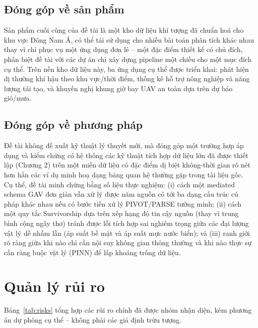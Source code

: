 \documentclass[12pt,a4paper]{report}
\begin{document}
\section{Đóng góp về sản phẩm}

Sản phẩm cuối cùng của đề tài là một kho dữ liệu khí tượng đã chuẩn hoá cho khu vực Đông Nam Á, có thể tái sử dụng cho nhiều bài toán phân tích khác nhau thay vì chỉ phục vụ một ứng dụng đơn lẻ -- một đặc điểm thiết kế có chủ đích, phân biệt đề tài với các dự án chỉ xây dựng pipeline một chiều cho một mục đích cụ thể. Trên nền kho dữ liệu này, ba ứng dụng cụ thể được triển khai: phát hiện dị thường khí hậu theo khu vực/thời điểm, thống kê hỗ trợ nông nghiệp và năng lượng tái tạo, và khuyến nghị khung giờ bay UAV an toàn dựa trên dự báo gió/mưa.

\section{Đóng góp về phương pháp}

Đề tài không đề xuất kỹ thuật lý thuyết mới, mà đóng góp một trường hợp áp dụng và kiểm chứng có hệ thống các kỹ thuật tích hợp dữ liệu lớn đã được thiết lập (Chương 2) trên một miền dữ liệu có đặc điểm dị biệt không-thời gian rõ nét hơn hẳn các ví dụ minh hoạ dạng bảng quan hệ thường gặp trong tài liệu gốc. Cụ thể, đề tài minh chứng bằng số liệu thực nghiệm: (i) cách một mediated schema GAV đơn giản vẫn xử lý được năm nguồn có tới ba dạng cấu trúc cú pháp khác nhau nếu có bước tiền xử lý PIVOT/PARSE tường minh; (ii) cách một quy tắc Survivorship dựa trên xếp hạng độ tin cậy nguồn (thay vì trung bình cộng ngây thơ) tránh được lỗi tích hợp sai nghiêm trọng giữa các đại lượng vật lý dễ nhầm lẫn (áp suất bề mặt và áp suất mực nước biển); và (iii) ranh giới rõ ràng giữa khi nào chỉ cần nội suy không gian thông thường và khi nào thực sự cần ràng buộc vật lý (PINN) để lấp khoảng trống dữ liệu.

\chapter{Quản lý rủi ro}

Bảng~\ref{tab:risks} tổng hợp các rủi ro chính đã được nhóm nhận diện, kèm phương án dự phòng cụ thể -- không phải các giả định trừu tượng.
\end{document}
